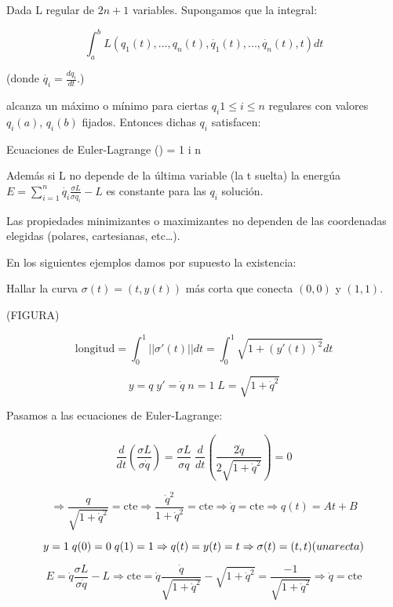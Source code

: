 \begin{prop}
Dada L regular de $2n + 1$ variables. Supongamos que la integral:

 $$\int_a^b L(q_1(t),...,q_n(t),\dot{q_1}(t),...,\dot{q_n}(t),t) dt$$

 (donde $\dot{q_i} = \frac{dq_i}{dt}$.)

 alcanza un máximo o mínimo para ciertas $q_i 1\leq i \leq n$ regulares con valores $q_i(a)$, $q_i(b)$ fijados. Entonces dichas $q_i$ satisfacen:


\begin{op}{Ecuaciones de Euler-Lagrange}
 () =     1 \leq i \leq n
\end{op}

Además si L no depende de la última variable (la t suelta) la energúa $ E = \sum_{i=1}^n \dot{q_i} \frac{\sigma L}{\sigma \dot{q_i}} - L$ es constante para las $q_i$ solución.

Las propiedades minimizantes o maximizantes no dependen de las coordenadas elegidas (polares, cartesianas, etc…).

\end{prop}

En los  siguientes ejemplos damos por supuesto la existencia:

\begin{example}
Hallar la curva $\sigma (t) = (t, y(t))$ más corta que conecta $(0,0)$ y $(1,1)$.

(FIGURA)

$$ \text{longitud} = \int_0^1 || \sigma'(t) || dt = \int_0^1 \sqrt{1 + (y'(t))^2} dt$$

$$y = q \; y' = \dot{q} \; n=1 \; L = \sqrt{1 + \dot{q}^2}$$

Pasamos a las ecuaciones de Euler-Lagrange:

$$\frac{d}{dt}(\frac{\sigma L}{\sigma \dot{q}}) = \frac{\sigma L}{\sigma q} \; \frac{d}{dt}(\frac{2 \dot{q}}{2 \sqrt{1 + \dot{q}^2}}) = 0$$

$$\Rightarrow \frac{q}{\sqrt{1 + \dot{q}^2}} = \text{cte} \Rightarrow \frac{\dot{q}^2}{1 + \dot{q}^2} = \text{cte} \Rightarrow \dot{q} = \text{cte} \Rightarrow q(t) = At + B $$

$$ y = 1 \; q(0) = 0 \; q(1) = 1 \Rightarrow q(t) = y(t) = t \Rightarrow \sigma (t) = (t,t) \text(una recta)$$

\begin{obs}
$$E = \dot{q} \frac{\sigma L}{\sigma \dot{q}} - L \Rightarrow \text{cte} = \dot{q} \frac{\dot{q}}{\sqrt{1 + \dot{q}^2}} - \sqrt{1 + \dot{q}^2} = \frac{-1}{\sqrt{1 + \dot{q}^2}} \Rightarrow \dot{q} = \text{cte}$$
\end{obs}

\end{example}




